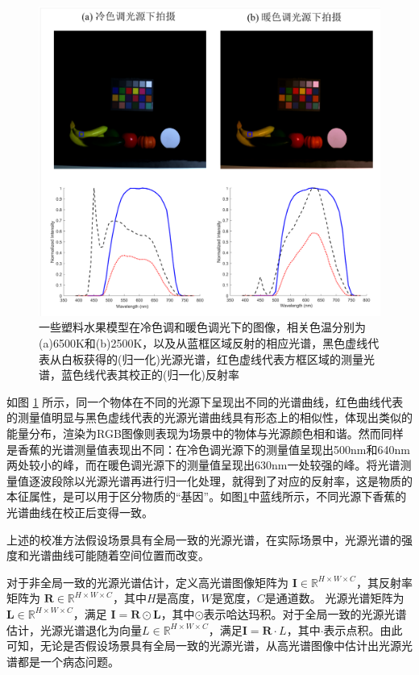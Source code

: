 \documentclass[
    type = master, %
    degree = academic,        %
    decl-page,  %
  ]{njuthesis}
\begin{document}
\begin{figure}[h]
	\begin{center}
		\includegraphics[width=0.8\linewidth]{docs/fig-chap1/fig-1-intro.pdf}
	\end{center}
	\caption{一些塑料水果模型在冷色调和暖色调光下的图像，相关色温分别为(a)6500K和(b)2500K，以及从蓝框区域反射的相应光谱，黑色虚线代表从白板获得的(归一化)光源光谱，红色虚线代表方框区域的测量光谱，蓝色线代表其校正的(归一化)反射率}
	\label{fig:correct}
\end{figure}

如图 \ref{fig:correct} 所示，同一个物体在不同的光源下呈现出不同的光谱曲线，红色曲线代表的测量值明显与黑色虚线代表的光源光谱曲线具有形态上的相似性，体现出类似的能量分布，渲染为RGB图像则表现为场景中的物体与光源颜色相和谐。然而同样是香蕉的光谱测量值表现出不同：在冷色调光源下的测量值呈现出500nm和640nm两处较小的峰，而在暖色调光源下的测量值呈现出630nm一处较强的峰。将光谱测量值逐波段除以光源光谱再进行归一化处理，就得到了对应的反射率，这是物质的本征属性，是可以用于区分物质的“基因”。如图\ref{fig:correct}中蓝线所示，不同光源下香蕉的光谱曲线在校正后变得一致。

上述的校准方法假设场景具有全局一致的光源光谱，在实际场景中，光源光谱的强度和光谱曲线可能随着空间位置而改变。

对于非全局一致的光源光谱估计，定义高光谱图像矩阵为 $\mathbf{I} \in \mathbb{R}^{H \times W \times C}$，其反射率矩阵为 $\mathbf{R} \in \mathbb{R}^{H \times W \times C}$，其中$H$是高度，$W$是宽度，$C$是通道数。 光源光谱矩阵为$\mathbf{L} \in \mathbb{R}^{H \times W \times C}$，满足 $\mathbf{I} = \mathbf{R}\odot\mathbf{L}$，其中$\odot$表示哈达玛积。对于全局一致的光源光谱估计，光源光谱退化为向量$L \in \mathbb{R}^{H \times W \times C}$，满足$\mathbf{I} = \mathbf{R}\cdot L$，其中$\cdot$表示点积。由此可知，无论是否假设场景具有全局一致的光源光谱，从高光谱图像中估计出光源光谱都是一个病态问题。
\end{document}
